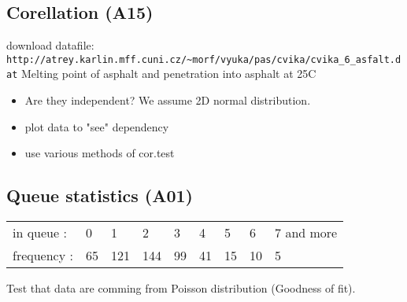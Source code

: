\documentclass[4pt]{article}
\begin{document}
\subsection{Corellation (A15)}
download datafile: \verb'http://atrey.karlin.mff.cuni.cz/~morf/vyuka/pas/cvika/cvika_6_asfalt.dat'
Melting point of asphalt and penetration into asphalt at 25\textdegree C

\begin{itemize}
 \item Are they independent? We assume 2D normal distribution.

 \item plot data to "see" dependency
 \item use various methods of cor.test
\end{itemize}


\subsection{Queue statistics (A01)}

\begin{tabular}{lllllllll}
in queue        : &0  &1   &2   &3  &4  &5  &6  &7 and more\\
frequency       : &65 &121 &144 &99 &41 &15 &10 &5
\end{tabular}
Test that data are comming from Poisson distribution (Goodness of fit).






%
%  
%
%
%
%
%
%
%
\end{document}
